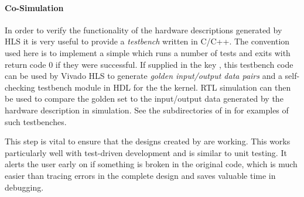 \paragraph{Co-Simulation}
In order to verify the functionality of the hardware descriptions generated by HLS it is very useful to provide a \emph{testbench} written in C/C++.
The convention used here is to implement a simple  which runs a number of tests and exits with return code 0 if they were successful.
If supplied in the  key , this testbench code can be used by Vivado HLS to generate \emph{golden input/output data pairs} and a self-checking testbench module in HDL for the the kernel.
RTL simulation can then be used to compare the golden set to the input/output data generated by the hardware description in simulation.
See the subdirectories of  in \tpchome{} for examples of such testbenches.

\medskip
\begin{note}
This step is vital to ensure that the designs created by \tpc{} are working.
This works particularly well with test-driven development and is similar to unit testing.
It alerts the user early on if something is broken in the original code, which is much easier than tracing errors in the complete design and saves valuable time in debugging.
\end{note}
